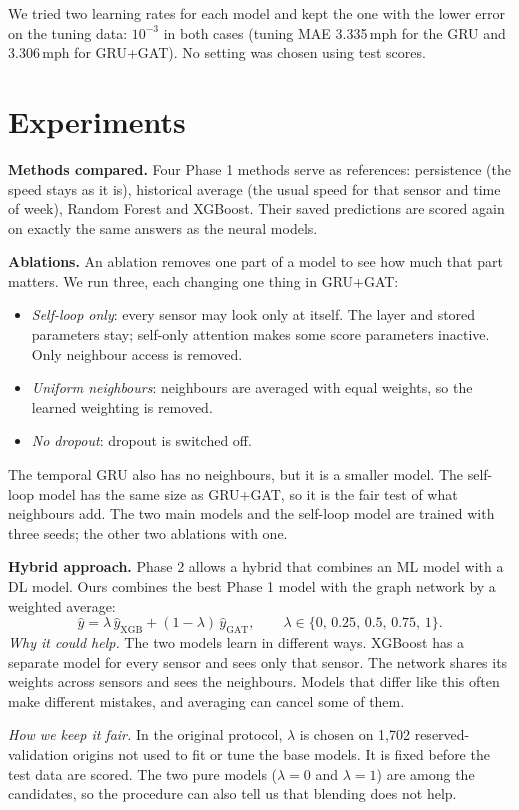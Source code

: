 \documentclass[conference]{IEEEtran}
\begin{document}
We tried two learning rates for each model and kept the one with the lower error on the tuning data: $10^{-3}$ in both cases (tuning MAE 3.335\,mph for the GRU and 3.306\,mph for GRU+GAT). No setting was chosen using test scores.

\section{Experiments}
\textbf{Methods compared.} Four Phase 1 methods serve as references: persistence (the speed stays as it is), historical average (the usual speed for that sensor and time of week), Random Forest and XGBoost. Their saved predictions are scored again on exactly the same answers as the neural models.

\textbf{Ablations.} An ablation removes one part of a model to see how much that part matters. We run three, each changing one thing in GRU+GAT:
\begin{itemize}
\item \emph{Self-loop only}: every sensor may look only at itself. The layer and stored parameters stay; self-only attention makes some score parameters inactive. Only neighbour access is removed.
\item \emph{Uniform neighbours}: neighbours are averaged with equal weights, so the learned weighting is removed.
\item \emph{No dropout}: dropout is switched off.
\end{itemize}
The temporal GRU also has no neighbours, but it is a smaller model. The self-loop model has the same size as GRU+GAT, so it is the fair test of what neighbours add. The two main models and the self-loop model are trained with three seeds; the other two ablations with one.

\textbf{Hybrid approach.} Phase 2 allows a hybrid that combines an ML model with a DL model. Ours combines the best Phase 1 model with the graph network by a weighted average:
\[\hat y=\lambda\,\hat y_{\mathrm{XGB}}+(1-\lambda)\,\hat y_{\mathrm{GAT}},\qquad \lambda\in\{0,\,0.25,\,0.5,\,0.75,\,1\}.\]
\emph{Why it could help.} The two models learn in different ways. XGBoost has a separate model for every sensor and sees only that sensor. The network shares its weights across sensors and sees the neighbours. Models that differ like this often make different mistakes, and averaging can cancel some of them.

\emph{How we keep it fair.} In the original protocol, $\lambda$ is chosen on 1,702 reserved-validation origins not used to fit or tune the base models. It is fixed before the test data are scored. The two pure models ($\lambda=0$ and $\lambda=1$) are among the candidates, so the procedure can also tell us that blending does not help.
\end{document}
